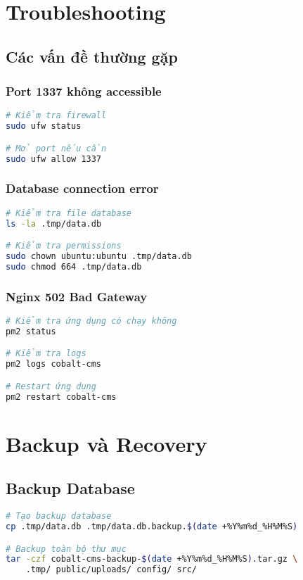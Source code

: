 \documentclass[12pt,a4paper]{article}
\begin{document}
\section{Troubleshooting}

\subsection{Các vấn đề thường gặp}

\subsubsection{Port 1337 không accessible}
\begin{lstlisting}[language=bash]
# Kiểm tra firewall
sudo ufw status

# Mở port nếu cần
sudo ufw allow 1337
\end{lstlisting}

\subsubsection{Database connection error}
\begin{lstlisting}[language=bash]
# Kiểm tra file database
ls -la .tmp/data.db

# Kiểm tra permissions
sudo chown ubuntu:ubuntu .tmp/data.db
sudo chmod 664 .tmp/data.db
\end{lstlisting}

\subsubsection{Nginx 502 Bad Gateway}
\begin{lstlisting}[language=bash]
# Kiểm tra ứng dụng có chạy không
pm2 status

# Kiểm tra logs
pm2 logs cobalt-cms

# Restart ứng dụng
pm2 restart cobalt-cms
\end{lstlisting}

\section{Backup và Recovery}

\subsection{Backup Database}
\begin{lstlisting}[language=bash]
# Tạo backup database
cp .tmp/data.db .tmp/data.db.backup.$(date +%Y%m%d_%H%M%S)

# Backup toàn bộ thư mục
tar -czf cobalt-cms-backup-$(date +%Y%m%d_%H%M%S).tar.gz \
    .tmp/ public/uploads/ config/ src/
\end{lstlisting}
\end{document}
